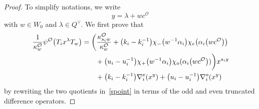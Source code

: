 \documentclass[11pt]{article}
\numberwithin{equation}{section}
\numberwithin{equation}{section}
\begin{document}
\begin{proof}
To simplify notations, we write
\[
y=\lambda+wc^\mathcal{O}
\]
with $w\in W_0$ and $\lambda\in Q^\vee$.
We first prove that
\begin{gather}
\frac{1}{\kappa_w^\mathcal{O}} \psi^\mathcal{O}\bigl(T_ix^\lambda T_w\bigr)
=\biggl(\frac{\kappa_{s_iw}^\mathcal{O}}{\kappa_w^\mathcal{O}}
+\bigl(k_i-k_i^{-1}\bigr)\chi_-\bigl(w^{-1}\alpha_i\bigr)\chi_e\bigl(\alpha_i\bigl(wc^\mathcal{O}\bigr)\bigr)\nonumber\\
\hphantom{\frac{1}{\kappa_w^\mathcal{O}} \psi^\mathcal{O}\bigl(T_ix^\lambda T_w\bigr)=\biggl(}{}
 +\bigl(u_i-u_i^{-1}\bigr)\chi_+\bigl(w^{-1}\alpha_i\bigr)\chi_o(\alpha_i\bigl(wc^\mathcal{O}\bigr))\biggr)x^{s_iy}\nonumber\\
 \hphantom{\frac{1}{\kappa_w^\mathcal{O}} \psi^\mathcal{O}\bigl(T_ix^\lambda T_w\bigr)=}{}
 +\bigl(k_i-k_i^{-1}\bigr)\nabla_i^e(x^y)+\bigl(u_i-u_i^{-1}\bigr)\nabla_i^o(x^y)
\label{formula}
\end{gather}
by rewriting the two quotients in~\eqref{spoint} in terms of the odd and even truncated difference operators.


\end{proof}
\end{document}

